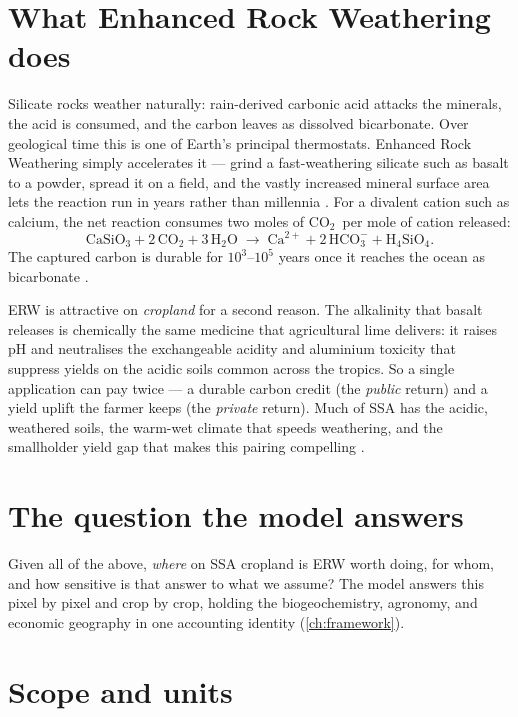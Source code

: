 \documentclass[openany]{book}
\newcommand{\co}{\ensuremath{\mathrm{CO_2}}}
\begin{document}
\section{What Enhanced Rock Weathering does}

Silicate rocks weather naturally: rain-derived carbonic acid attacks the
minerals, the acid is consumed, and the carbon leaves as dissolved bicarbonate.
Over geological time this is one of Earth's principal thermostats. Enhanced Rock
Weathering simply accelerates it --- grind a fast-weathering silicate such as
basalt to a powder, spread it on a field, and the vastly increased mineral
surface area lets the reaction run in years rather than millennia
\citep{hartmann2013, beerling2020}. For a divalent cation such as calcium, the
net reaction consumes two moles of \co\ per mole of cation released:
%
\begin{equation}
\mathrm{CaSiO_3} + 2\,\mathrm{CO_2} + 3\,\mathrm{H_2O}
\;\longrightarrow\;
\mathrm{Ca^{2+}} + 2\,\mathrm{HCO_3^-} + \mathrm{H_4SiO_4}.
\label{eq:weathering}
\end{equation}
%
The captured carbon is durable for $10^3$--$10^5$ years once it reaches the
ocean as bicarbonate \citep{renforth2019, kanzaki2023}.

ERW is attractive on \emph{cropland} for a second reason. The alkalinity that
basalt releases is chemically the same medicine that agricultural lime
delivers: it raises pH and neutralises the exchangeable acidity and aluminium
toxicity that suppress yields on the acidic soils common across the tropics.
So a single application can pay twice --- a durable carbon credit (the
\emph{public} return) and a yield uplift the farmer keeps (the \emph{private}
return). Much of SSA has the acidic, weathered soils, the warm-wet climate that
speeds weathering, and the smallholder yield gap that makes this pairing
compelling \citep{beerling2020, baek2023}.

\section{The question the model answers}

Given all of the above, \emph{where} on SSA cropland is ERW worth doing, for whom,
and how sensitive is that answer to what we assume? The model answers this pixel
by pixel and crop by crop, holding the biogeochemistry, agronomy, and
economic geography in one accounting identity (\autoref{ch:framework}).

\section{Scope and units}
\end{document}
